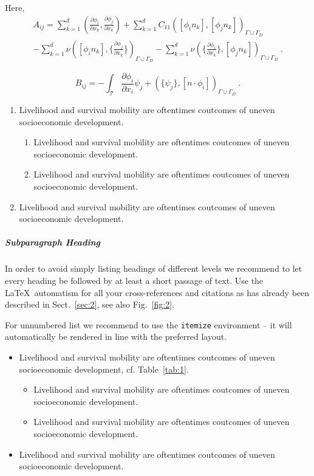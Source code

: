 \documentclass[graybox]{svmult}
\begin{document}
Here, 
\begin{equation} \label{matrix A}
\begin{split}
A_{ij} = \sum_{k=1}^d (\frac{\partial \phi_i}{\partial x_k} , \frac{\partial \phi_j}{\partial x_k}) + \sum_{k=1}^d C_{11} ([\phi_i n_k] , [\phi_j n_k])_{\Gamma \cup \Gamma_D} \\ - \sum_{k=1}^d \nu ([\phi_i n_k] , \lbrace \frac{\partial \phi_j}{\partial x_k} \rbrace)_{\Gamma \cup \Gamma_D} - \sum_{k=1}^d \nu (\lbrace \frac{\partial \phi_i}{\partial x_k} \rbrace , [\phi_j n_k])_{\Gamma \cup \Gamma_D} \ .
\end{split}
\end{equation}

\begin{equation} \label{matrix B}
B_{ij} = - \int_{\mathcal{T}} \frac{\partial \phi_i}{\partial x_i} \psi_j +
(\lbrace \psi_j \rbrace , [n \cdot \phi_i])_{\Gamma \cup \Gamma_D} \ .
\end{equation}



\begin{enumerate}
\item{Livelihood and survival mobility are oftentimes coutcomes of uneven socioeconomic development.}
\begin{enumerate}
\item{Livelihood and survival mobility are oftentimes coutcomes of uneven socioeconomic development.}
\item{Livelihood and survival mobility are oftentimes coutcomes of uneven socioeconomic development.}
\end{enumerate}
\item{Livelihood and survival mobility are oftentimes coutcomes of uneven socioeconomic development.}
\end{enumerate}


\subparagraph{Subparagraph Heading} In order to avoid simply listing headings of different levels we recommend to let every heading be followed by at least a short passage of text. Use the \LaTeX\ automatism for all your cross-references and citations as has already been described in Sect.~\ref{sec:2}, see also Fig.~\ref{fig:2}.

For unnumbered list we recommend to use the \verb|itemize| environment -- it will automatically be rendered in line with the preferred layout.

\begin{itemize}
\item{Livelihood and survival mobility are oftentimes coutcomes of uneven socioeconomic development, cf. Table~\ref{tab:1}.}
\begin{itemize}
\item{Livelihood and survival mobility are oftentimes coutcomes of uneven socioeconomic development.}
\item{Livelihood and survival mobility are oftentimes coutcomes of uneven socioeconomic development.}
\end{itemize}
\item{Livelihood and survival mobility are oftentimes coutcomes of uneven socioeconomic development.}
\end{itemize}
\end{document}
